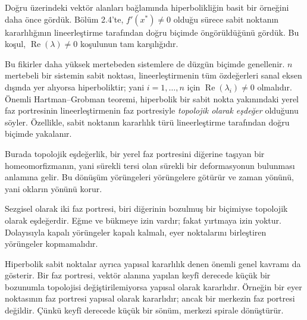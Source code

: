 \begin{justify}
Doğru üzerindeki vektör alanları bağlamında hiperbolikliğin basit bir örneğini daha önce gördük. Bölüm 2.4'te, $f'(x^{*})\neq0$ olduğu sürece sabit noktanın kararlılığının lineerleştirme tarafından doğru biçimde öngörüldüğünü gördük. Bu koşul, $\operatorname{Re}(\lambda)\neq0$ koşulunun tam karşılığıdır.

Bu fikirler daha yüksek mertebeden sistemlere de düzgün biçimde genellenir. $n$ mertebeli bir sistemin sabit noktası, lineerleştirmenin tüm özdeğerleri sanal eksen dışında yer alıyorsa hiperboliktir; yani $i=1,\ldots,n$ için $\operatorname{Re}(\lambda_i)\neq0$ olmalıdır. Önemli Hartman--Grobman teoremi, hiperbolik bir sabit nokta yakınındaki yerel faz portresinin lineerleştirmenin faz portresiyle \textit{topolojik olarak eşdeğer} olduğunu söyler. Özellikle, sabit noktanın kararlılık türü lineerleştirme tarafından doğru biçimde yakalanır.

Burada topolojik eşdeğerlik, bir yerel faz portresini diğerine taşıyan bir homeomorfizmanın, yani sürekli tersi olan sürekli bir deformasyonun bulunması anlamına gelir. Bu dönüşüm yörüngeleri yörüngelere götürür ve zaman yönünü, yani okların yönünü korur.

Sezgisel olarak iki faz portresi, biri diğerinin bozulmuş bir biçimiyse topolojik olarak eşdeğerdir. Eğme ve bükmeye izin vardır; fakat yırtmaya izin yoktur. Dolayısıyla kapalı yörüngeler kapalı kalmalı, eyer noktalarını birleştiren yörüngeler kopmamalıdır.

Hiperbolik sabit noktalar ayrıca yapısal kararlılık denen önemli genel kavramı da gösterir. Bir faz portresi, vektör alanına yapılan keyfî derecede küçük bir bozunumla topolojisi değiştirilemiyorsa yapısal olarak kararlıdır. Örneğin bir eyer noktasının faz portresi yapısal olarak kararlıdır; ancak bir merkezin faz portresi değildir. Çünkü keyfî derecede küçük bir sönüm, merkezi spirale dönüştürür.
\end{justify}


\newpage

